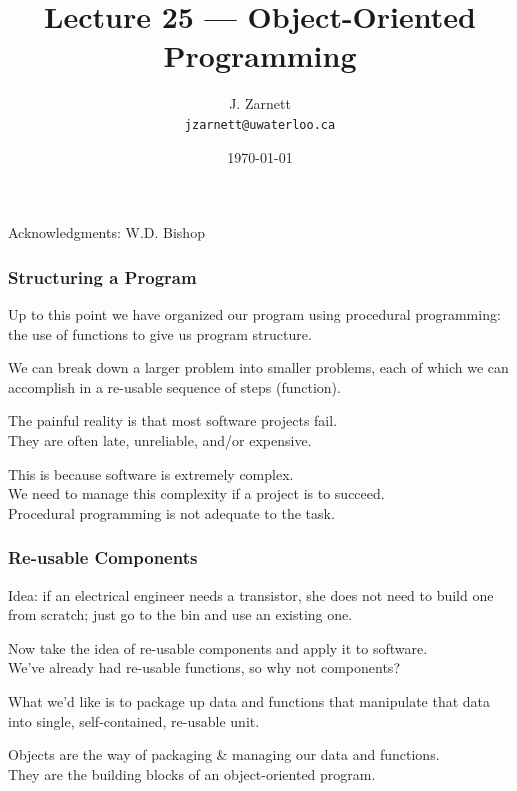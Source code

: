 

\title{Lecture 25 --- Object-Oriented Programming }

\author{J. Zarnett\\
\texttt{jzarnett@uwaterloo.ca}}
\date{\today}



\begin{frame}
  \titlepage
  
  \begin{center}
  \small{Acknowledgments: W.D. Bishop}
  \end{center}
\end{frame}



\begin{frame}
\frametitle{Structuring a Program}

Up to this point we have organized our program using procedural programming: the use of functions to give us program structure.

We can break down a larger problem into smaller problems, each of which we can accomplish in a re-usable sequence of steps (function).

The painful reality is that most software projects fail.\\
\quad They are often late, unreliable, and/or expensive.

This is because software is extremely complex.\\
\quad We need to manage this complexity if a project is to succeed.\\
\quad Procedural programming is not adequate to the task.

\end{frame}

\begin{frame}
\frametitle{Re-usable Components}

Idea: if an electrical engineer needs a transistor, she does not need to build one from scratch; just go to the bin and use an existing one.

Now take the idea of re-usable components and apply it to software.\\
\quad We've already had re-usable functions, so why not components?

What we'd like is to package up data and functions that manipulate that data into single, self-contained, re-usable unit.

\alert{Objects} are the way of packaging \& managing our data and functions.\\
\quad They are the building blocks of an object-oriented program.

\end{frame}

